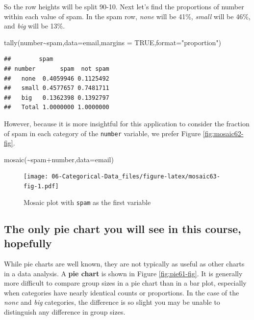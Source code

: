 \documentclass[
]{book}
\newenvironment{Shaded}{\begin{snugshade}}{\end{snugshade}}
\newcommand{\AttributeTok}[1]{\textcolor[rgb]{0.77,0.63,0.00}{#1}}
\newcommand{\ConstantTok}[1]{\textcolor[rgb]{0.00,0.00,0.00}{#1}}
\newcommand{\FunctionTok}[1]{\textcolor[rgb]{0.00,0.00,0.00}{#1}}
\newcommand{\NormalTok}[1]{#1}
\newcommand{\SpecialCharTok}[1]{\textcolor[rgb]{0.00,0.00,0.00}{#1}}
\newcommand{\StringTok}[1]{\textcolor[rgb]{0.31,0.60,0.02}{#1}}
\begin{document}
So the row heights will be split 90-10. Next let's find the proportions of number within each value of spam. In the spam row, \emph{none} will be 41\%, \emph{small} will be 46\%, and \emph{big} will be 13\%.

\begin{Shaded}
\begin{Highlighting}[]
\FunctionTok{tally}\NormalTok{(number}\SpecialCharTok{\textasciitilde{}}\NormalTok{spam,}\AttributeTok{data=}\NormalTok{email,}\AttributeTok{margins =} \ConstantTok{TRUE}\NormalTok{,}\AttributeTok{format=}\StringTok{"proportion"}\NormalTok{)}
\end{Highlighting}
\end{Shaded}

\begin{verbatim}
##        spam
## number       spam  not spam
##   none  0.4059946 0.1125492
##   small 0.4577657 0.7481711
##   big   0.1362398 0.1392797
##   Total 1.0000000 1.0000000
\end{verbatim}

However, because it is more insightful for this application to consider the fraction of spam in each category of the \texttt{number} variable, we prefer Figure \ref{fig:mosaic62-fig}.



\begin{Shaded}
\begin{Highlighting}[]
\FunctionTok{mosaic}\NormalTok{(}\SpecialCharTok{\textasciitilde{}}\NormalTok{spam}\SpecialCharTok{+}\NormalTok{number,}\AttributeTok{data=}\NormalTok{email)}
\end{Highlighting}
\end{Shaded}

\begin{figure}
\centering
\texttt{[image: 06-Categorical-Data\_files/figure-latex/mosaic63-fig-1.pdf]}
\caption{\label{fig:mosaic63-fig}Mosaic plot with \texttt{spam} as the first variable}
\end{figure}

\hypertarget{the-only-pie-chart-you-will-see-in-this-course-hopefully}{%
\subsection{The only pie chart you will see in this course, hopefully}\label{the-only-pie-chart-you-will-see-in-this-course-hopefully}}

While pie charts are well known, they are not typically as useful as other charts in a data analysis. A \textbf{pie chart} is shown in Figure \ref{fig:pie61-fig}. It is generally more difficult to compare group sizes in a pie chart than in a bar plot, especially when categories have nearly identical counts or proportions. In the case of the \emph{none} and \emph{big} categories, the difference is so slight you may be unable to distinguish any difference in group sizes.
\end{document}
